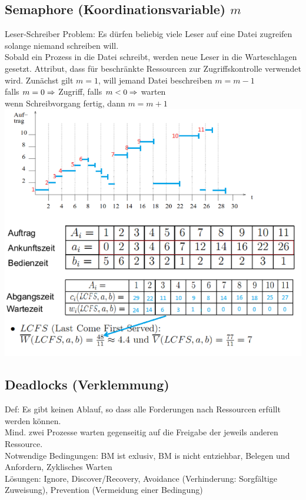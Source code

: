 \documentclass[fs]{latex4ei}
\begin{document}
\begin{multicols}{4}
\subsection{Semaphore (Koordinationsvariable) $m$}
Leser-Schreiber Problem:
Es dürfen beliebig viele Leser auf eine Datei zugreifen solange niemand schreiben will.\\
Sobald ein Prozess in die Datei schreibt, werden neue Leser in die Warteschlagen gesetzt.
Attribut, dass für beschränkte Ressourcen zur Zugriffskontrolle verwendet wird.
Zunächst gilt $m = 1$, will jemand Datei beschreiben $m = m-1$\\
falls $m = 0 \Rightarrow$ Zugriff, falls $m < 0 \Rightarrow$ warten\\
wenn Schreibvorgang fertig, dann $m = m +1$\\


\includegraphics[scale = 0.5]{./img/Prozessorverwaltung.pdf}


\subsection{Deadlocks (Verklemmung)}
Def: Es gibt keinen Ablauf, so dass alle Forderungen nach Ressourcen erfüllt werden können.\\
Mind. zwei Prozesse warten gegenseitig auf die Freigabe der jeweils anderen Ressource.\\
Notwendige Bedingungen:
BM ist exlusiv, BM is nicht entziehbar, Belegen und Anfordern, Zyklisches Warten\\ 
Lösungen: Ignore, Discover/Recovery, Avoidance (Verhinderung: Sorgfältige Zuweisung), Prevention (Vermeidung einer Bedingung)\\


\end{multicols}
\end{document}
